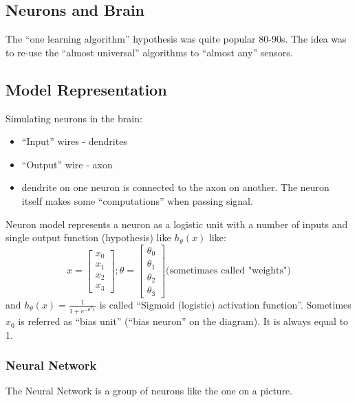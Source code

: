 \documentclass{scrartcl}
\begin{document}
\subsection{Neurons and Brain}
\label{sec:8-2}
The ``one learning algorithm'' hypothesis was quite popular 80-90s.
The idea was to re-use the ``almost universal'' algorithms to ``almost
any'' sensors.

\subsection{Model Representation}
\label{sec:8-3}
Simulating neurons in the brain:
\begin{itemize}
\item ``Input'' wires - dendrites
\item ``Output'' wire - axon
\item dendrite on one neuron is connected to the axon on another. The
  neuron itself makes some ``computations'' when passing signal.
\end{itemize}

Neuron model represents a neuron as a logistic unit with a number of
inputs and single output function (hypothesis) like $ h_\theta(x) $
like: \[ x = \left[ \begin{array}{c} x_0 \\ x_1 \\ x_2 \\
    x_3 \end{array} \right];
\theta = \left[ \begin{array}{c}  \theta_0 \\ \theta_1 \\ \theta_2 \\
    \theta_3 \end{array} \right] \textrm{(sometimaes called
  "weights")} \] and $h_\theta(x)=\frac{1}{1 + e^{-\theta^Tx}}$ is
called ``Sigmoid (logistic) activation function''. Sometimes $x_0$ is
referred as ``bias unit'' (``bias neuron'' on the diagram). It is
always equal to 1.

\subsubsection{Neural Network}
The Neural Network is a group of neurons like the one on a picture.
\end{document}
